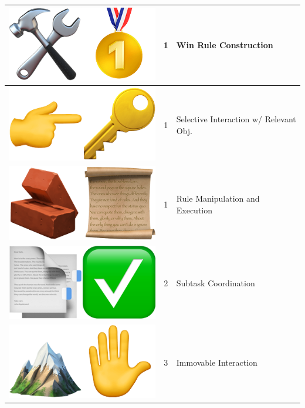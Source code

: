 \begin{table}
\begin{tabular}{ccl}
		\midrule \rowcolor{gray!30} \includegraphics[scale=0.07]{figs/emojis/emoji_5.png} & 1                       & Win Rule Construction                  \\
		\midrule \rowcolor{gray!30} \includegraphics[scale=0.07]{figs/emojis/emoji_6.png} & 1                       & Selective Interaction w/ Relevant Obj. \\
		\midrule \rowcolor{gray!30} \includegraphics[scale=0.07]{figs/emojis/emoji_7.png} & 1                       & Rule Manipulation and Execution        \\
		\midrule \rowcolor{gray!60} \includegraphics[scale=0.07]{figs/emojis/emoji_8.png} & 2                       & Subtask Coordination                   \\
		\midrule \rowcolor{gray!90} \includegraphics[scale=0.07]{figs/emojis/emoji_9.png} & 3                       & Immovable Interaction                  \\

\end{tabular}
\end{table}
